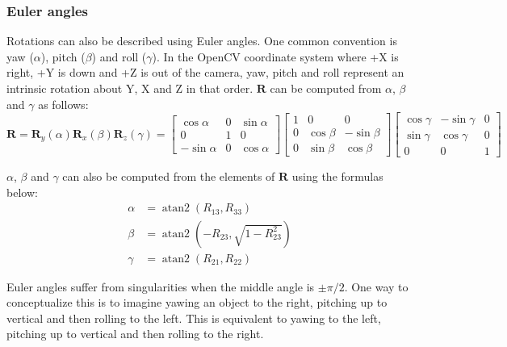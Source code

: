\documentclass{article}
\begin{document}
\subsubsection{Euler angles}
Rotations can also be described using Euler angles. One common convention is yaw ($\alpha$), pitch ($\beta$) and roll ($\gamma$). In the OpenCV coordinate system where +X is right, +Y is down and +Z is out of the camera, yaw, pitch and roll represent an intrinsic\footnotemark{} rotation about Y, X and Z in that order. $\mathbf{R}$ can be computed from $\alpha$, $\beta$ and $\gamma$ as follows:
\begin{equation*}
    \mathbf{R} = \mathbf{R}_y(\alpha) \mathbf{R}_x(\beta) \mathbf{R}_z(\gamma) = \begin{bmatrix} \cos\alpha & 0 & \sin\alpha \\ 0 & 1 & 0 \\ -\sin\alpha & 0 & \cos\alpha \end{bmatrix} \begin{bmatrix} 1 & 0 & 0 \\ 0 & \cos\beta & -\sin\beta \\ 0 & \sin\beta & \cos\beta \end{bmatrix} \begin{bmatrix} \cos\gamma & -\sin\gamma & 0 \\ \sin\gamma & \cos\gamma & 0 \\ 0 & 0 & 1 \end{bmatrix}
\end{equation*}


$\alpha$, $\beta$ and $\gamma$ can also be computed from the elements of $\mathbf{R}$ using the formulas below:
\begin{align*}
    \alpha & = \operatorname{atan2}\left({R_{13}},{R_{33}}\right) \\
    \beta & = \operatorname{atan2}\left({-R_{23}},{\sqrt{1-R_{23}^2}}\right) \\
    \gamma & = \operatorname{atan2}\left({R_{21}},{R_{22}}\right)
\end{align*}

Euler angles suffer from singularities when the middle angle is $\pm \pi/2$. One way to conceptualize this is to imagine yawing an object to the right, pitching up to vertical and then rolling to the left. This is equivalent to yawing to the left, pitching up to vertical and then rolling to the right.
\end{document}
